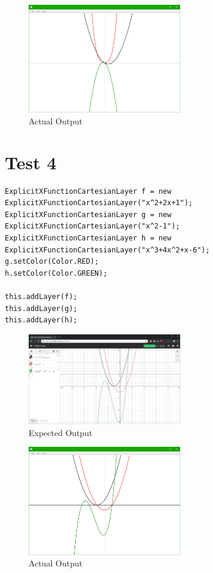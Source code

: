 \documentclass[../../../main.tex]{subfiles}
\begin{document}
\begin{figure}[H]
	\centering
	\includegraphics[width=0.6\textwidth]{tests/actual3}
	\caption{Actual Output}
\end{figure}
\newpage

\section{Test 4}
\begin{verbatim}
ExplicitXFunctionCartesianLayer f = new ExplicitXFunctionCartesianLayer("x^2+2x+1");
ExplicitXFunctionCartesianLayer g = new ExplicitXFunctionCartesianLayer("x^2-1");
ExplicitXFunctionCartesianLayer h = new ExplicitXFunctionCartesianLayer("x^3+4x^2+x-6");
g.setColor(Color.RED);
h.setColor(Color.GREEN);

this.addLayer(f);
this.addLayer(g);
this.addLayer(h);
\end{verbatim}

\begin{figure}[H]
	\centering
	\includegraphics[width=0.6\textwidth]{tests/expected4}
	\caption{Expected Output}
\end{figure}

\begin{figure}[H]
	\centering
	\includegraphics[width=0.6\textwidth]{tests/actual4}
	\caption{Actual Output}
\end{figure}
\newpage
\end{document}
